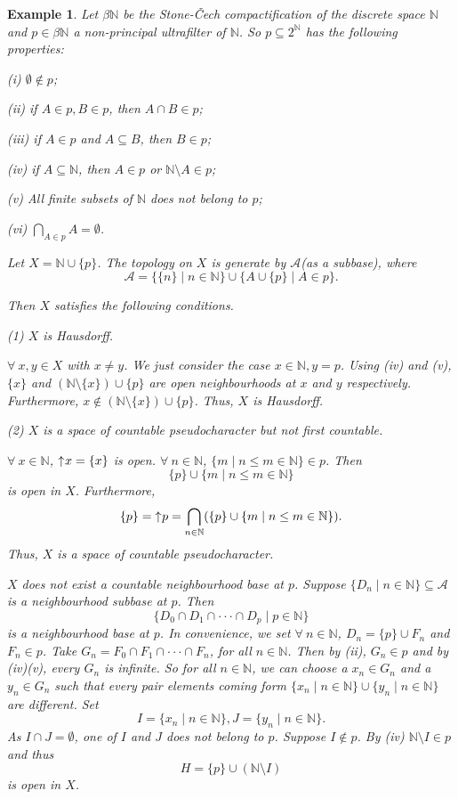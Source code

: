 \documentclass[preprint,12pt]{elsarticle}
\numberwithin{equation}{section}
\newtheorem{example}[theorem]{Example}
\newcommand{\up}{\mathord{\uparrow}\hspace{0.05em}}
\begin{document}
\begin{example} {\rm Let $\beta\mathbb{N}$ be the Stone-\v{C}ech compactification of the discrete space $\mathbb{N}$ and $p\in\beta\mathbb{N}$ a non-principal ultrafilter of $\mathbb{N}$. So $p\subseteq 2^{\mathbb{N}}$ has the following properties:

(i) $\emptyset\not\in p$;

(ii) if $A\in p, B\in p$, then $A\cap B\in p$;

(iii) if $A\in p$ and $A\subseteq B$, then $B\in p$;

(iv) if $A\subseteq\mathbb{N}$, then $A\in p$ or $\mathbb{N}\setminus A\in p$;

(v) All finite subsets of $\mathbb{N}$ does not belong to $p$;

(vi) $\bigcap\limits_{A\in p}A=\emptyset$.

Let $X=\mathbb{N}\cup\{p\}$. The topology on $X$ is generate by $\mathcal{A}$(as a subbase), where
$$\mathcal{A}=\{\{n\}\mid n\in\mathbb{N}\}\cup\{A\cup\{p\}\mid A\in p\}.$$

Then $X$ satisfies the following conditions.

(1) $X$ is Hausdorff.

$\forall\ x,y\in X$ with $x\neq y$. We just consider the case $x\in\mathbb{N},y=p$. Using (iv) and (v), $\{x\}$ and $(\mathbb{N}\setminus\{x\})\cup\{p\}$ are open neighbourhoods at $x$ and $y$ respectively. Furthermore, $x\not\in(\mathbb{N}\setminus\{x\})\cup\{p\}$. Thus, $X$ is Hausdorff.

(2) $X$ is a space of countable pseudocharacter but not first countable.

$\forall\ x\in \mathbb{N}$, $\up x=\{x\}$ is open. $\forall\ n\in\mathbb{N}$, $\{m\mid n\leq m\in\mathbb{N}\}\in p$. Then $$\{p\}\cup\{m\mid n\leq m\in\mathbb{N}\}$$ is open in $X$. Furthermore, $$\{p\}=\up p=\bigcap\limits_{n\in\mathbb{N}}(\{p\}\cup\{m\mid n\leq m\in\mathbb{N}\}).$$ Thus, $X$ is a space of countable pseudocharacter.

$X$ does not exist a countable neighbourhood base at $p$. Suppose $\{D_{n}\mid n\in\mathbb{N}\}\subseteq\mathcal{A}$ is a neighbourhood subbase at $p$. Then $$\{D_{0}\cap D_{1}\cap\cdot\cdot\cdot\cap D_{p}\mid p\in\mathbb{N}\}$$ is a neighbourhood base at $p$. In convenience, we set $\forall\ n\in\mathbb{N}$, $D_{n}=\{p\}\cup F_{n}$ and $F_{n}\in p$. Take $G_{n}=F_{0}\cap F_{1}\cap\cdot\cdot\cdot\cap F_{n}$, for all $n\in\mathbb{N}$. Then by (ii), $G_{n}\in p$ and by (iv)(v), every $G_{n}$ is infinite. So for all $n\in\mathbb{N}$, we can choose a $x_{n}\in G_{n}$ and a $y_{n}\in G_{n}$ such that every pair elements coming form $\{x_{n}\mid n\in\mathbb{N}\}\cup\{y_{n}\mid n\in\mathbb{N}\}$ are different. Set
$$I=\{x_{n}\mid n\in\mathbb{N}\},J=\{y_{n}\mid n\in\mathbb{N}\}.$$ As $I\cap J=\emptyset$, one of $I$ and $J$ does not belong to $p$. Suppose $I\not\in p$. By (iv) $\mathbb{N}\setminus I\in p$ and thus
$$H=\{p\}\cup(\mathbb{N}\setminus I)$$ is open in $X$.

}
\end{example}
\end{document}
